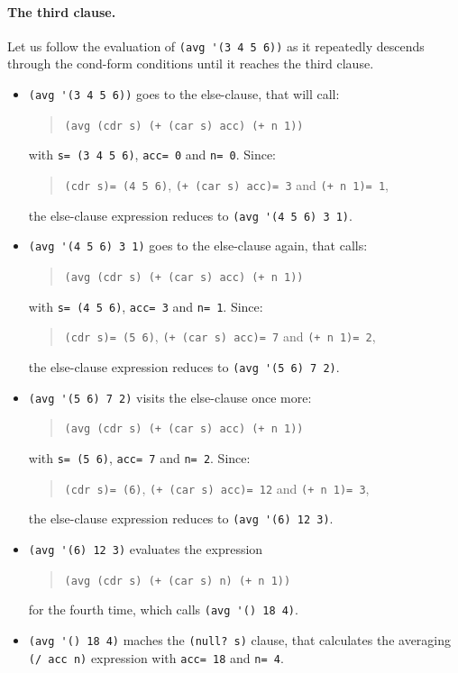 \documentclass[a4paper,12pt]{book}
\begin{document}
\paragraph{The third clause.}
Let us follow the evaluation of \verb|(avg '(3 4 5 6))|
as it repeatedly  descends through the cond-form conditions
until it reaches the third clause.

\begin{itemize}
\item\verb|(avg '(3 4 5 6))|
goes to the else-clause, that will call:
\begin{quote}
  \verb|(avg (cdr s) (+ (car s) acc) (+ n 1))|
\end{quote}
with
  \verb|s= (3 4 5 6)|, \verb|acc= 0|
  and \verb|n= 0|. Since:
\begin{quote}
  \verb|(cdr s)= (4 5 6)|,
  \verb|(+ (car s) acc)= 3| and
  \verb|(+ n 1)= 1|,
\end{quote}
  the else-clause expression reduces to
  \verb|(avg '(4 5 6) 3 1)|.
\item\verb|(avg '(4 5 6) 3 1)| goes to the
  else-clause again, that calls:
  \begin{quote}
    \verb|(avg (cdr s) (+ (car s) acc) (+ n 1))|
  \end{quote}
  with \verb|s= (4 5 6)|, \verb|acc= 3| and \verb|n= 1|.
  Since:
\begin{quote}
  \verb|(cdr s)= (5 6)|,
  \verb|(+ (car s) acc)= 7| and
  \verb|(+ n 1)= 2|,
\end{quote}
   the else-clause expression reduces to
   \verb|(avg '(5 6) 7 2)|.
 \item \verb|(avg '(5 6) 7 2)| visits 
   the else-clause once more:
  \begin{quote}
    \verb|(avg (cdr s) (+ (car s) acc) (+ n 1))|
  \end{quote}
  with \verb|s= (5 6)|, \verb|acc= 7| and \verb|n= 2|.
  Since:
\begin{quote}
  \verb|(cdr s)= (6)|,
  \verb|(+ (car s) acc)= 12| and
  \verb|(+ n 1)= 3|,
\end{quote}
   the else-clause expression reduces to
   \verb|(avg '(6) 12 3)|.
 \item\verb|(avg '(6) 12 3)| evaluates the
   expression
\begin{quote}
    \verb|(avg (cdr s) (+ (car s) n) (+ n 1))|
\end{quote} 
for the fourth time, which calls \verb|(avg '() 18 4)|.
\item \verb|(avg '() 18 4)|  maches
  the \verb|(null? s)| clause, that calculates the
  averaging \verb|(/ acc n)| expression
  with \verb|acc= 18| and \verb|n= 4|.
\end{itemize}
\end{document}
